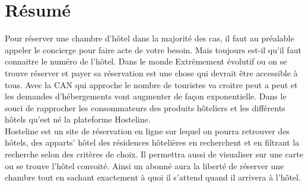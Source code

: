 \chapter{Résumé}

Pour réserver une chambre d’hôtel dans la majorité des cas, il faut au préalable appeler le concierge pour faire acte de votre besoin. Mais toujours est-il qu’il faut connaitre le numéro de l’hôtel. Dans le monde Extrêmement évolutif ou on se trouve réserver et payer sa réservation  est une chose qui devrait être accessible à tous. Avec la CAN qui approche le nombre de touristes va croitre peut a peut et les demandes d’hébergements vont augmenter de façon exponentielle. Dans le souci de rapprocher les consommateurs des produits hôteliers et les différents hôtels qu’est né la plateforme Hosteline.\\

Hosteline est un site de réservation en ligne sur lequel on pourra retrouver des hôtels, des apparts’ hôtel des résidences hôtelières en recherchent et en filtrant la recherche selon des critères de choix. Il permettra aussi de visualiser sur une carte ou se trouve l’hôtel convoité. Ainsi un abonné aura la liberté de réserver une chambre tout en sachant exactement à quoi il s’attend quand il arrivera à l’hôtel. 






